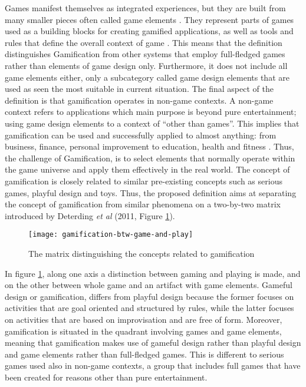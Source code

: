 Games manifest themselves as integrated experiences, but they are built from many smaller pieces often called game elements \cite{werbach2012win}. They represent parts of games used as a building blocks for creating gamified applications, as well as tools and rules that define the overall context of game \cite{gamDesElem}. This means that the definition distinguishes Gamification from other systems that employ full-fledged games rather than elements of game design only. Furthermore, it does not include all game elements either, only a subcategory called game design elements that are used as seen the most suitable in current situation. %
The final aspect of the definition is that gamification operates in non-game contexts. A non-game context refers to applications which main purpose is beyond pure entertainment; using game design elements to a context of ``other than games''. This implies that gamification can be used and successfully applied to almost anything: from business, finance, personal improvement to education, health and fitness \cite{deterding2011game}. Thus, the challenge of Gamification, is to select elements that normally operate within the game universe and apply them effectively in the real world.
The concept of gamification is closely related to similar pre-existing concepts such as serious games, playful design and toys. Thus, the proposed definition aims at separating the concept of gamification from similar phenomena on a two-by-two matrix introduced by Deterding \textit{et al} (2011, Figure \ref{fig:mesh1}). 
\begin{figure}[h]
    \centering
    \texttt{[image: gamification-btw-game-and-play]}
    \caption{The matrix distinguishing the concepts related to gamification}
    \label{fig:mesh1}
\end{figure}
In figure \ref{fig:mesh1}, along one axis a distinction between gaming and playing is made, and on the other between whole game and an artifact with game elements. Gameful design or gamification, differs from playful design because the former focuses on activities that are goal oriented and structured by rules, while the latter focuses on activities that are based on improvisation and are free of form. Moreover, gamification is situated in the quadrant involving games and game elements, meaning that gamification makes use of gameful design rather than playful design and game elements rather than full-fledged games. This is different to serious games used also in non-game contexts, a group that includes full games that have been created for reasons other than pure entertainment. 

